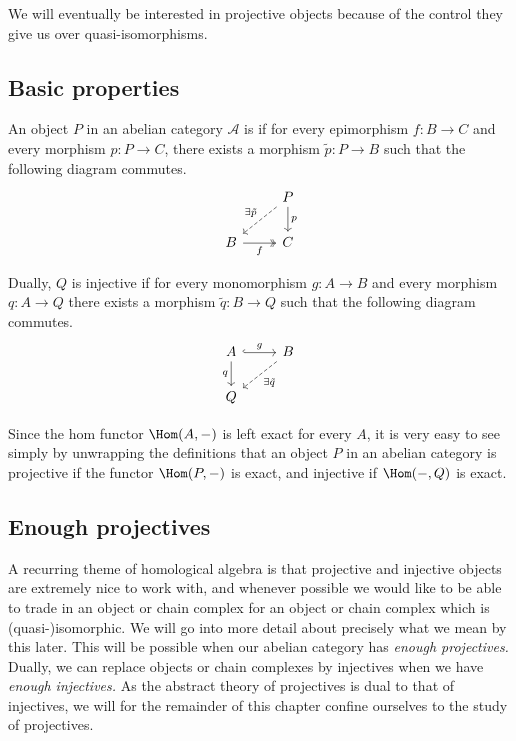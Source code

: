 \documentclass[main.tex]{subfiles}
\begin{document}
We will eventually be interested in projective objects because of the control they give us over quasi-isomorphisms.

\subsection{Basic properties}
\label{ssc:basic_properties}

\begin{definition}
  \label{def:projective_injective}
  An object $P$ in an abelian category $\mathcal{A}$ is  if for every epimorphism $f\colon B \to C$ and every morphism $p\colon P \to C$, there exists a morphism $\tilde{p}\colon P \to B$ such that the following diagram commutes.
  \begin{equation*}
    \begin{tikzcd}
      & P
      \arrow[d, "p"]
      \arrow[dl, dashed, swap, "\exists\tilde{p}"]
      \\
      B
      \arrow[r, twoheadrightarrow, swap, "f"]
      & C
    \end{tikzcd}
  \end{equation*}

  Dually, $Q$ is injective if for every monomorphism $g\colon A \to B$ and every morphism $q\colon A \to Q$ there exists a morphism $\tilde{q}\colon B \to Q$ such that the following diagram commutes.
  \begin{equation*}
    \begin{tikzcd}
      A
      \arrow[r, hookrightarrow, "g"]
      \arrow[d, swap, "q"]
      & B
      \arrow[dl, dashed, "\exists \tilde{q}"]
      \\
      Q
    \end{tikzcd}
  \end{equation*}
\end{definition}

Since the hom functor $\Hom(A, -)$ is left exact for every $A$, it is very easy to see simply by unwrapping the definitions that an object $P$ in an abelian category is projective if the functor $\Hom(P, -)$ is exact, and injective if $\Hom(-, Q)$ is exact.

\subsection{Enough projectives}
\label{ssc:enough_projectives}

A recurring theme of homological algebra is that projective and injective objects are extremely nice to work with, and whenever possible we would like to be able to trade in an object or chain complex for an object or chain complex which is (quasi-)isomorphic. We will go into more detail about precisely what we mean by this later. This will be possible when our abelian category has \emph{enough projectives.} Dually, we can replace objects or chain complexes by injectives when we have \emph{enough injectives.} As the abstract theory of projectives is dual to that of injectives, we will for the remainder of this chapter confine ourselves to the study of projectives.
\end{document}
